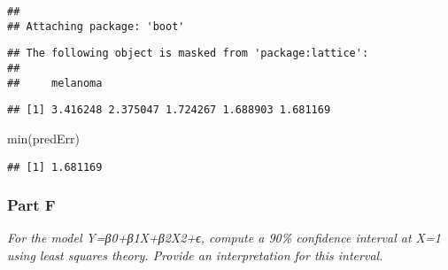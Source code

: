 \documentclass[
]{article}
\newenvironment{Shaded}{\begin{snugshade}}{\end{snugshade}}
\newcommand{\AttributeTok}[1]{\textcolor[rgb]{0.77,0.63,0.00}{#1}}
\newcommand{\ControlFlowTok}[1]{\textcolor[rgb]{0.13,0.29,0.53}{\textbf{#1}}}
\newcommand{\DecValTok}[1]{\textcolor[rgb]{0.00,0.00,0.81}{#1}}
\newcommand{\FunctionTok}[1]{\textcolor[rgb]{0.00,0.00,0.00}{#1}}
\newcommand{\NormalTok}[1]{#1}
\newcommand{\OtherTok}[1]{\textcolor[rgb]{0.56,0.35,0.01}{#1}}
\newcommand{\SpecialCharTok}[1]{\textcolor[rgb]{0.00,0.00,0.00}{#1}}
\begin{document}
\begin{verbatim}
## 
## Attaching package: 'boot'
\end{verbatim}

\begin{verbatim}
## The following object is masked from 'package:lattice':
## 
##     melanoma
\end{verbatim}

\begin{Shaded}
\end{Shaded}

\begin{verbatim}
## [1] 3.416248 2.375047 1.724267 1.688903 1.681169
\end{verbatim}

\begin{Shaded}
\begin{Highlighting}[]
\FunctionTok{min}\NormalTok{(predErr)}
\end{Highlighting}
\end{Shaded}

\begin{verbatim}
## [1] 1.681169
\end{verbatim}

\hypertarget{part-f}{%
\subsubsection{Part F}\label{part-f}}

\emph{For the model Y=β0+β1X+β2X2+ϵ, compute a 90\% confidence interval
at X=1 using least squares theory. Provide an interpretation for this
interval.}
\end{document}
